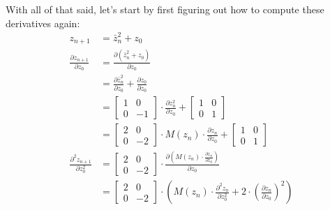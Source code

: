 \documentclass[12pt,a4paper]{article}
\newcommand{\eqar}[1]{\begin{align*} #1 \end{align*}}
\newcommand{\mat}[1]{\begin{bmatrix} #1 \end{bmatrix}}
\newcommand{\jmat}[2]{\frac{\partial #1}{\partial #2}}
\newcommand{\jmatn}[3]{\frac{\partial^{#1} #2}{\partial #3^{#1}}}
\begin{document}
With all of that said, let's start by first figuring out how to compute these derivatives again:
\eqar{
	z_{n+1} &= \bar{z}_n^2+z_0\\
	\jmat{z_{n+1}}{z_0} &= \jmat{(\bar{z}_n^2+z_0)}{z_0}\\
	&= \jmat{\bar{z}_n^2}{z_0}+\jmat{z_0}{z_0}\\
	&= \mat{1&0\\0&-1}\cdot\jmat{z_n^2}{z_0}+\mat{1&0\\0&1}\\
	&= \mat{2&0\\0&-2}\cdot M(z_n)\cdot\jmat{z_n}{z_0}+\mat{1&0\\0&1}\\
	\jmatn{2}{z_{n+1}}{z_0} &= \mat{2&0\\0&-2}\cdot\jmat{(M(z_n)\cdot\jmat{z_n}{z_0})}{z_0}\\
	&= \mat{2&0\\0&-2}\cdot\left(M(z_n)\cdot\jmatn{2}{z_n}{z_0}+2\cdot(\jmat{z_n}{z_0})^2\right)
}
\end{document}
